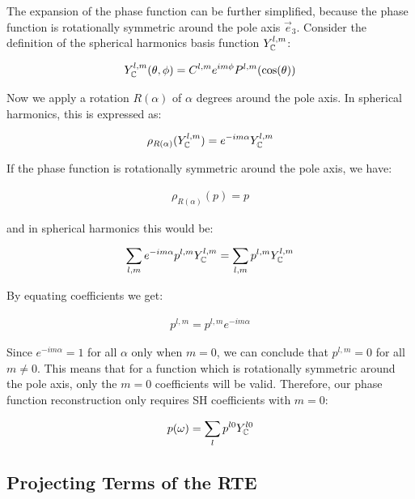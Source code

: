 \documentclass[10pt]{scrartcl}
\begin{document}
The expansion of the phase function can be further simplified, because the phase function is rotationally symmetric around the pole axis $\vec{e}_3$. Consider the definition of the spherical harmonics basis function $Y_{\mathbb{C}}^{l,m}$:

\begin{align*}
Y_{\mathbb{C}}^{l,m}(\theta, \phi) = C^{l,m}e^{im\phi}P^{l,m}(\operatorname{cos}(\theta))
\end{align*}

Now we apply a rotation $R(\alpha)$ of $\alpha$ degrees around the pole axis. In spherical harmonics, this is expressed as:

\begin{align*}
\rho_{R(\alpha)}(Y_{\mathbb{C}}^{l,m}) = e^{-i m\alpha}Y_{\mathbb{C}}^{l,m}
\end{align*}

If the phase function is rotationally symmetric around the pole axis, we have:

\begin{align*}
\rho_{R(\alpha)}(p) = p
\end{align*}

and in spherical harmonics this would be:

\begin{align*}
\sum_{l,m}
{
e^{-i m\alpha}
p^{l,m}
Y_{\mathbb{C}}^{l,m} }
=
\sum_{l,m}
{
p^{l,m}
Y_{\mathbb{C}}^{l,m}
}
\end{align*}

By equating coefficients we get:

\begin{align*}
p^{l,m} = p^{l,m}e^{-i m\alpha}
\end{align*}

Since $e^{-i m\alpha}=1$ for all $\alpha$ only when $m=0$, we can conclude that $p^{l,m} = 0$ for all $m\ne0$. This means that for a function which is rotationally symmetric around the pole axis, only the $m=0$ coefficients will be valid. Therefore, our phase function reconstruction only requires SH coefficients with $m=0$:

\begin{align}
\label{eq:sh_exp_phase}
p(\omega) =
\sum_l
{
p^{l0}
Y_{\mathbb{C}}^{l0}
}
\end{align}
%
 


\subsection{Projecting Terms of the RTE}
\end{document}
